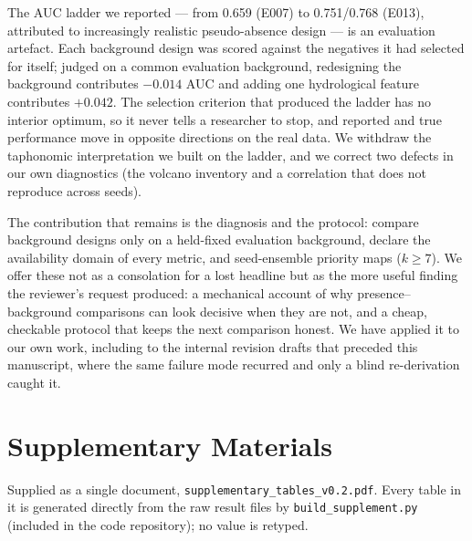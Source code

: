 \documentclass[12pt]{article}
\begin{document}
The AUC ladder we reported --- from 0.659 (E007) to 0.751/0.768 (E013), attributed to increasingly realistic pseudo-absence design --- is an evaluation artefact.
Each background design was scored against the negatives it had selected for itself; judged on a common evaluation background, redesigning the background contributes $-0.014$ AUC and adding one hydrological feature contributes $+0.042$.
The selection criterion that produced the ladder has no interior optimum, so it never tells a researcher to stop, and reported and true performance move in opposite directions on the real data.
We withdraw the taphonomic interpretation we built on the ladder, and we correct two defects in our own diagnostics (the volcano inventory and a correlation that does not reproduce across seeds).

The contribution that remains is the diagnosis and the protocol: compare background designs only on a held-fixed evaluation background, declare the availability domain of every metric, and seed-ensemble priority maps ($k \geq 7$).
We offer these not as a consolation for a lost headline but as the more useful finding the reviewer's request produced: a mechanical account of why presence--background comparisons can look decisive when they are not, and a cheap, checkable protocol that keeps the next comparison honest.
We have applied it to our own work, including to the internal revision drafts that preceded this manuscript, where the same failure mode recurred and only a blind re-derivation caught it.

\section*{Supplementary Materials}

Supplied as a single document, \texttt{supplementary\_tables\_v0.2.pdf}. Every table in it is generated directly from the raw result files by \texttt{build\_supplement.py} (included in the code repository); no value is retyped.
\end{document}
